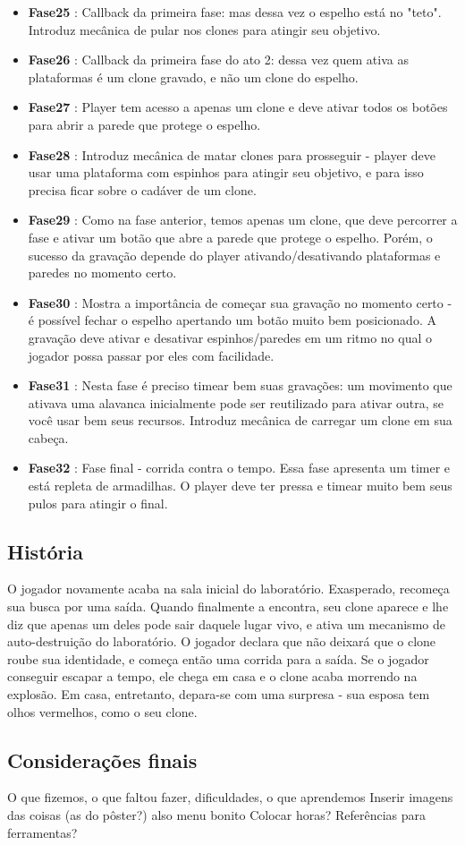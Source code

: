 \documentclass[a4paper, 11pt]{article}
\begin{document}
	\begin{itemize} 
		\item \textbf{Fase25} : Callback da primeira fase: mas dessa vez o espelho está no "teto". Introduz mecânica de pular nos clones para atingir seu objetivo.
		\item \textbf{Fase26} : Callback da primeira fase do ato 2: dessa vez quem ativa as plataformas é um clone gravado, e não um clone do espelho.
		\item \textbf{Fase27} : Player tem acesso a apenas um clone e deve ativar todos os botões para abrir a parede que protege o espelho.
		\item \textbf{Fase28} : Introduz mecânica de matar clones para prosseguir - player deve usar uma plataforma com espinhos para atingir seu objetivo, e para isso precisa ficar sobre o cadáver de um clone.
		\item \textbf{Fase29} : Como na fase anterior, temos apenas um clone, que deve percorrer a fase e ativar um botão que abre a parede que protege o espelho. Porém, o sucesso da gravação depende do player ativando/desativando plataformas e paredes no momento certo.
		\item \textbf{Fase30} : Mostra a importância de começar sua gravação no momento certo - é possível fechar o espelho apertando um botão muito bem posicionado. A gravação deve ativar e desativar espinhos/paredes em um ritmo no qual o jogador possa passar por eles com facilidade.
		\item \textbf{Fase31} : Nesta fase é preciso timear bem suas gravações: um movimento que ativava uma alavanca inicialmente pode ser reutilizado para ativar outra, se você usar bem seus recursos. Introduz mecânica de carregar um clone em sua cabeça.
		\item \textbf{Fase32} : Fase final - corrida contra o tempo. Essa fase apresenta um timer e está repleta de armadilhas. O player deve ter pressa e timear muito bem seus pulos para atingir o final.
	\end{itemize} 

\subsection{História} 
 
	O jogador novamente acaba na sala inicial do laboratório. Exasperado, recomeça sua busca por uma saída. Quando finalmente a encontra, seu clone aparece e lhe diz que apenas um deles pode sair daquele lugar vivo, e ativa um mecanismo de auto-destruição do laboratório. O jogador declara que não deixará que o clone roube sua identidade, e começa então uma corrida para a saída. Se o jogador conseguir escapar a tempo, ele chega em casa e o clone acaba morrendo na explosão. Em casa, entretanto, depara-se com uma surpresa - sua esposa tem olhos vermelhos, como o seu clone. 

\subsection{Considerações finais}
	O que fizemos, o que faltou fazer, dificuldades, o que aprendemos
 	Inserir imagens das coisas (as do pôster?) also menu bonito
 	Colocar horas?
 	Referências para ferramentas?
 
\end{document}
